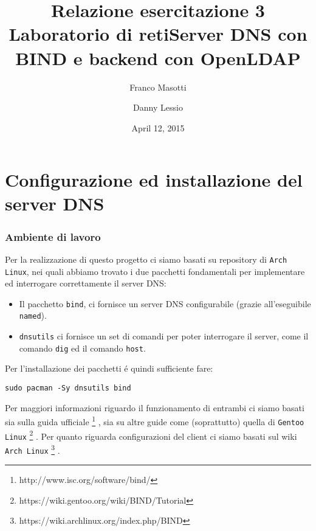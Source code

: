 \documentclass[9pt, a4paper, oneside]{article}
\title{Relazione esercitazione 3 Laboratorio di reti\newline Server DNS con BIND e backend con OpenLDAP}
\author{Franco Masotti \and Danny Lessio}
\date{April 12, 2015}
\begin{document}
	\maketitle
	\tableofcontents
	\newpage
	\part{Configurazione ed installazione del server DNS}
		\section{Ambiente di lavoro}
			\par
				Per la realizzazione di questo progetto ci 
				siamo basati su repository di
				\texttt{Arch Linux}, nei quali abbiamo 
				trovato i due pacchetti fondamentali per 
				implementare ed interrogare correttamente il 
				server DNS:
				\begin{itemize}
				\item
					Il pacchetto \texttt{bind}, ci fornisce 
					un server DNS configurabile (grazie 
					all'eseguibile \texttt{named}).
				 \item
					\texttt{dnsutils} ci fornisce un set 
					di comandi per poter interrogare il 
					server, come il comando 
					\texttt{dig} ed il comando 
					\texttt{host}.
				\end{itemize}
				Per l'installazione dei pacchetti \'e quindi 
				sufficiente fare:
				\begin{verbatim}
sudo pacman -Sy dnsutils bind
				\end{verbatim}
				Per maggiori informazioni riguardo il 
				funzionamento di entrambi ci siamo basati sia 
				sulla guida ufficiale
				\footnote{http://www.isc.org/software/bind/}
				, sia su altre guide come (soprattutto) quella
				di \texttt{Gentoo Linux}
				\footnote{https://wiki.gentoo.org/wiki/BIND/Tutorial}
				. Per quanto riguarda configurazioni del client 
				ci siamo basati sul wiki \texttt{Arch Linux}
				\footnote{https://wiki.archlinux.org/index.php/BIND}
				.
\end{document}
